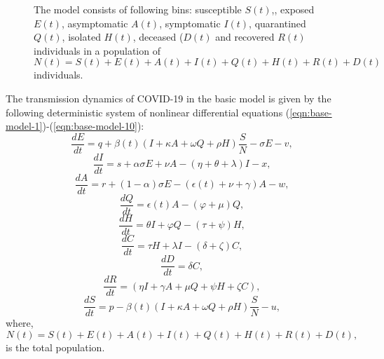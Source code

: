\documentclass[authoryear,preprint]{elsarticle}
\begin{document}
\begin{figure*}
\begin{tikzpicture}[x=0.75pt,y=0.75pt,yscale=-0.75,xscale=0.75]
\end{tikzpicture}

\caption[Model]{The model consists of following bins: susceptible $S(t)$,, exposed $E(t)$, asymptomatic $A(t)$, symptomatic $I(t)$, quarantined $Q(t)$, isolated $H(t)$,  deceased ($D(t)$ and recovered $R(t)$ individuals in a population of $N(t) = S(t) + E(t) + A(t) + I(t) + Q(t) + H(t) + R(t) + D(t)$ individuals.}
\label{fig1} 
\end{figure*}

The transmission dynamics of COVID-19 in the basic model is given by the following deterministic system of nonlinear differential equations (\ref{eqn:base-model-1})-(\ref{eqn:base-model-10}):
\begin{equation}
\frac{dE}{dt} = q + \beta(t) \left( I + \kappa A + \omega Q + \rho H \right) \frac{S}{N} - \sigma E - v, 
\label{eqn:base-model-1}
\end{equation}
\begin{equation}
\frac{dI}{dt} = s + \alpha \sigma E + \nu A - \left( \eta + \theta + \lambda \right) I - x,
\label{eqn:base-model-2}
\end{equation}
\begin{equation}
\frac{dA}{dt} = r + \left( 1-\alpha \right) \sigma E - \left( \epsilon(t) + \nu + \gamma \right) A - w,
\label{eqn:base-model-3}
\end{equation}
\begin{equation}
\frac{dQ}{dt} = \epsilon(t) A - \left( \varphi + \mu \right) Q,
\label{eqn:base-model-4}
\end{equation}
\begin{equation}
\frac{dH}{dt} = \theta I + \varphi Q - \left( \tau + \psi \right) H ,
\label{eqn:base-model-5}
\end{equation}
\begin{equation}
\frac{dC}{dt} =  \tau H + \lambda I - \left( \delta + \zeta \right) C,
\label{eqn:base-model-6}
\end{equation}
\begin{equation}
\frac{dD}{dt} =  \delta C,
\label{eqn:base-model-7}
\end{equation}
\begin{equation}
\frac{dR}{dt} =  \left( \eta I +  \gamma A + \mu Q + \psi H + \zeta C \right),
\label{eqn:base-model-8}
\end{equation}
\begin{equation}
\frac{dS}{dt} = p -\beta(t) \left( I + \kappa A + \omega Q + \rho H \right) \frac{S}{N} - u,
\label{eqn:base-model-9}
\end{equation}
where,
\begin{equation}
N(t) = S(t) + E(t) + A(t) + I(t) + Q(t) + H(t) + R(t) + D(t),
\label{eqn:base-model-10}
\end{equation}
is the total population. 
\end{document}
